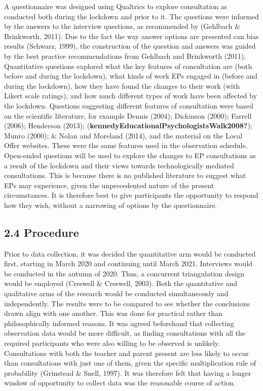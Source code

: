 \documentclass[
  english,
  man]{apa7}
\begin{document}
A questionnaire was designed using Qualtrics to explore consultation as conducted both during the lockdown and prior to it. The questions were informed by the answers to the interview questions, as recommended by (Gehlbach \& Brinkworth, 2011). Due to the fact the way answer options are presented can bias results (Schwarz, 1999), the construction of the question and answers was guided by the best practice recommendations from Gehlbach and Brinkworth (2011). Quantitative questions explored what the key features of consultation are (both before and during the lockdown), what kinds of work EPs engaged in (before and during the lockdown), how they have found the changes to their work (with Likert scale ratings), and how much different types of work have been affected by the lockdown. Questions suggesting different features of consultation were based on the scientific literature, for example Dennis (2004); Dickinson (2000); Farrell (2006); Henderson (2013); (\textbf{kennedyEducationalPsychologistsWalk2008?}); Munro (2000); \& Nolan and Moreland (2014), and the material on the Local Offer websites. These were the same features used in the observation schedule. Open-ended questions will be used to explore the changes to EP consultations as a result of the lockdown and their views towards technologically mediated consultations. This is because there is no published literature to suggest what EPs may experience, given the unprecedented nature of the present circumstances. It is therefore best to give participants the opportunity to respond how they wish, without a narrowing of options by the questionnaire.

\hypertarget{procedure}{%
\subsection{2.4 Procedure}\label{procedure}}

Prior to data collection, it was decided the quantitative arm would be conducted first, starting in March 2020 and continuing until March 2021. Interviews would be conducted in the autumn of 2020. Thus, a concurrent triangulation design would be employed (Creswell \& Creswell, 2003). Both the quantitative and qualitative arms of the research would be conducted simultaneously and independently. The results were to be compared to see whether the conclusions drawn align with one another. This was done for practical rather than philosophically informed reasons. It was agreed beforehand that collecting observation data would be more difficult, as finding consultations with all the required participants who were also willing to be observed is unlikely. Consultations with both the teacher and parent present are less likely to occur than consultations with just one of them, given the specific multiplication rule of probability (Grinstead \& Snell, 1997). It was therefore felt that having a longer window of opportunity to collect data was the reasonable course of action.
\end{document}
